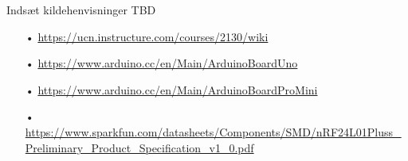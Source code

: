 Indsæt kildehenvisninger TBD
\begin{enumerate}
	\item[•] \url{https://ucn.instructure.com/courses/2130/wiki}
	\item[•] \url{https://www.arduino.cc/en/Main/ArduinoBoardUno}
	\item[•] \url{https://www.arduino.cc/en/Main/ArduinoBoardProMini}
	\item[•] \url{https://www.sparkfun.com/datasheets/Components/SMD/nRF24L01Pluss_Preliminary_Product_Specification_v1_0.pdf}
\end{enumerate}


